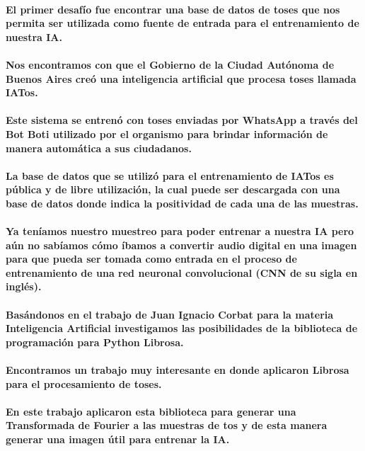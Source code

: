 \documentclass[a4paper,11pt,twocolumn]{article}
\begin{document}
\paragraph{El primer desafío fue encontrar una base de datos de toses que nos permita ser utilizada como fuente de entrada para el entrenamiento de nuestra IA.}
\paragraph{Nos encontramos con que el Gobierno de la Ciudad Autónoma de Buenos Aires creó una inteligencia artificial que procesa toses llamada IATos.}
\paragraph{Este sistema se entrenó con toses enviadas por WhatsApp a través del Bot Boti utilizado por el organismo para brindar información de manera automática a sus ciudadanos.}
\paragraph{La base de datos que se utilizó para el entrenamiento de IATos es pública y de libre utilización, la cual puede ser descargada con una base de datos donde indica la positividad de cada una de las muestras.}
\paragraph{Ya teníamos nuestro muestreo para poder entrenar a nuestra IA pero aún no sabíamos cómo íbamos a convertir audio digital en una imagen para que pueda ser tomada como entrada en el proceso de entrenamiento de una red neuronal convolucional (CNN de su sigla en inglés).}
\paragraph{Basándonos en el trabajo de Juan Ignacio Corbat para la materia Inteligencia Artificial investigamos las posibilidades de la biblioteca de programación para Python Librosa.}
\paragraph{Encontramos un trabajo muy interesante en donde aplicaron Librosa para el procesamiento de toses.}
\paragraph{En este trabajo aplicaron esta biblioteca para generar una Transformada de Fourier a las muestras de tos y de esta manera generar una imagen útil para entrenar la IA.}
\end{document}
